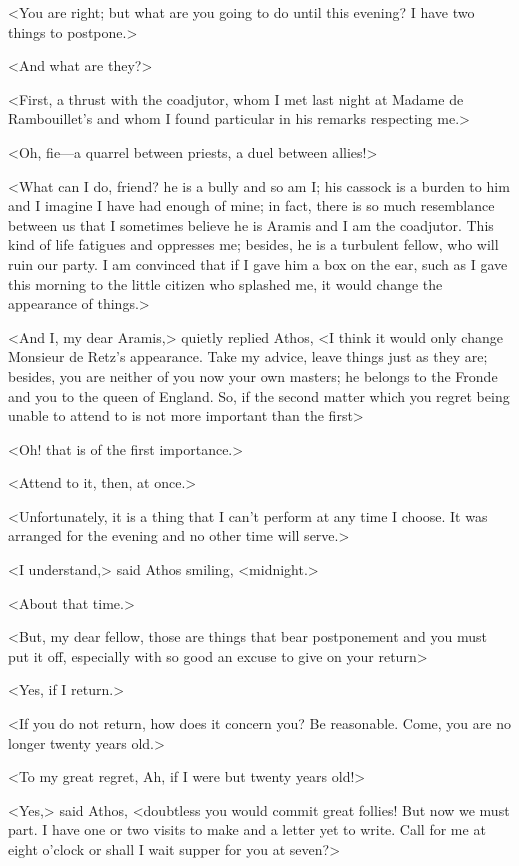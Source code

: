 <You are right; but what are you going to do until this evening? I have two things to postpone.>

<And what are they?>

<First, a thrust with the coadjutor, whom I met last night at Madame de Rambouillet's and whom I found particular in his remarks respecting me.>

<Oh, fie—a quarrel between priests, a duel between allies!>

<What can I do, friend? he is a bully and so am I; his cassock is a burden to him and I imagine I have had enough of mine; in fact, there is so much resemblance between us that I sometimes believe he is Aramis and I am the coadjutor. This kind of life fatigues and oppresses me; besides, he is a turbulent fellow, who will ruin our party. I am convinced that if I gave him a box on the ear, such as I gave this morning to the little citizen who splashed me, it would change the appearance of things.>

<And I, my dear Aramis,> quietly replied Athos, <I think it would only change Monsieur de Retz's appearance. Take my advice, leave things just as they are; besides, you are neither of you now your own masters; he belongs to the Fronde and you to the queen of England. So, if the second matter which you regret being unable to attend to is not more important than the first\longdash>

<Oh! that is of the first importance.>

<Attend to it, then, at once.>

<Unfortunately, it is a thing that I can't perform at any time I choose. It was arranged for the evening and no other time will serve.>

<I understand,> said Athos smiling, <midnight.>

<About that time.>

<But, my dear fellow, those are things that bear postponement and you must put it off, especially with so good an excuse to give on your return\longdash>

<Yes, if I return.>

<If you do not return, how does it concern you? Be reasonable. Come, you are no longer twenty years old.>

<To my great regret,  Ah, if I were but twenty years old!>

<Yes,> said Athos, <doubtless you would commit great follies! But now we must part. I have one or two visits to make and a letter yet to write. Call for me at eight o'clock or shall I wait supper for you at seven?>

